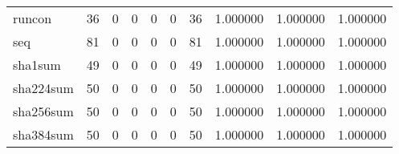 \begin{longtable}{lrrrrrrrrr}
runcon    &                                        36 &                                                  0 &                                                  0 &                                                  0 &                                                  0 &                                                 36 &                                           1.000000 &                               1.000000 &                             1.000000 \\
seq       &                                        81 &                                                  0 &                                                  0 &                                                  0 &                                                  0 &                                                 81 &                                           1.000000 &                               1.000000 &                             1.000000 \\
sha1sum   &                                        49 &                                                  0 &                                                  0 &                                                  0 &                                                  0 &                                                 49 &                                           1.000000 &                               1.000000 &                             1.000000 \\
sha224sum &                                        50 &                                                  0 &                                                  0 &                                                  0 &                                                  0 &                                                 50 &                                           1.000000 &                               1.000000 &                             1.000000 \\
sha256sum &                                        50 &                                                  0 &                                                  0 &                                                  0 &                                                  0 &                                                 50 &                                           1.000000 &                               1.000000 &                             1.000000 \\
sha384sum &                                        50 &                                                  0 &                                                  0 &                                                  0 &                                                  0 &                                                 50 &                                           1.000000 &                               1.000000 &                             1.000000 \\

\end{longtable}
